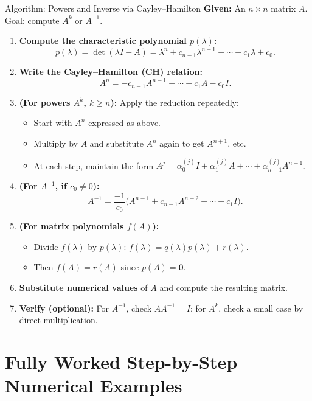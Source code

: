 \documentclass[12pt,a4paper]{article}
\begin{document}
\begin{learnbox}{Algorithm: Powers and Inverse via Cayley--Hamilton}
\textbf{Given:} An \(n \times n\) matrix \(A\). Goal: compute \(A^k\) or \(A^{-1}\).

\begin{enumerate}
  \item \textbf{Compute the characteristic polynomial \(p(\lambda)\):}
    \[
      p(\lambda) = \det(\lambda I - A) = \lambda^n + c_{n-1}\lambda^{n-1} + \cdots + c_1\lambda + c_0.
    \]
  \item \textbf{Write the Cayley--Hamilton (CH) relation:}
    \[
      A^n = -c_{n-1}A^{n-1} - \cdots - c_1 A - c_0 I.
    \]
  \item \textbf{(For powers \(A^k\), \(k \geq n\)):} Apply the reduction repeatedly:
    \begin{itemize}
      \item Start with \(A^n\) expressed as above.
      \item Multiply by \(A\) and substitute \(A^n\) again to get \(A^{n+1}\), etc.
      \item At each step, maintain the form \(A^j = \alpha_0^{(j)} I + \alpha_1^{(j)} A + \cdots + \alpha_{n-1}^{(j)} A^{n-1}\).
    \end{itemize}
  \item \textbf{(For \(A^{-1}\), if \(c_0 \neq 0\)):}
    \[
      A^{-1} = \frac{-1}{c_0}\bigl(A^{n-1} + c_{n-1}A^{n-2} + \cdots + c_1 I\bigr).
    \]
  \item \textbf{(For matrix polynomials \(f(A)\)):}
    \begin{itemize}
      \item Divide \(f(\lambda)\) by \(p(\lambda)\): \(f(\lambda) = q(\lambda)p(\lambda) + r(\lambda)\).
      \item Then \(f(A) = r(A)\) since \(p(A) = \mathbf{0}\).
    \end{itemize}
  \item \textbf{Substitute numerical values} of \(A\) and compute the resulting matrix.
  \item \textbf{Verify (optional):} For \(A^{-1}\), check \(AA^{-1} = I\); for \(A^k\), check a small case by direct multiplication.
\end{enumerate}
\end{learnbox}

\section{Fully Worked Step-by-Step Numerical Examples}
\end{document}
